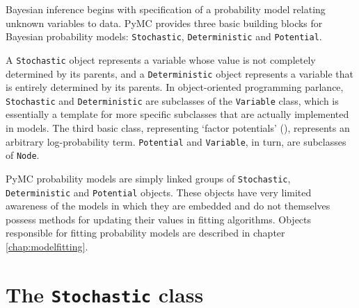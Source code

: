 
Bayesian inference begins with specification of a probability model relating unknown variables to data. PyMC provides three basic building blocks for Bayesian probability models: \texttt{Stochastic}, \texttt{Deterministic} and \texttt{Potential}. 

A \texttt{Stochastic} object represents a variable whose value is not completely determined by its parents, and a \texttt{Deterministic} object represents a variable that is entirely determined by its parents. In object-oriented programming parlance, \texttt{Stochastic} and \texttt{Deterministic} are subclasses of the \texttt{Variable} class, which is essentially a template for more specific subclasses that are actually implemented in models. The third basic class, representing `factor potentials' (\cite{dawidmarkov,Jordan:2004p5439}), represents an arbitrary log-probability term. \texttt{Potential} and \texttt{Variable}, in turn, are subclasses of \texttt{Node}.



\medskip
PyMC probability models are simply linked groups of \texttt{Stochastic}, \texttt{Deterministic} and \texttt{Potential} objects. These objects have very limited awareness of the models in which they are embedded and do not themselves possess methods for updating their values in fitting algorithms. Objects responsible for fitting probability models are described in chapter \ref{chap:modelfitting}.
 

\hypertarget{stochastic}{}
\section*{The \texttt{Stochastic} class} \label{stochastic}

